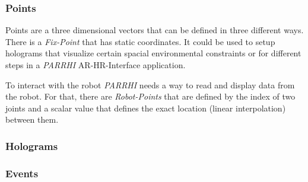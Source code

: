 \subsubsection{Points}\label{Section:Points}
Points are a three dimensional vectors that can be defined in three different ways. There is a \textit{Fix-Point} that has static coordinates. It could be used to setup holograms that visualize certain spacial environmental constraints or for different steps in a \textit{PARRHI} AR-HR-Interface application. 


To interact with the robot \textit{PARRHI} needs a way to read and display data from the robot. For that, there are \textit{Robot-Points} that are defined by the index of two joints and a scalar value that defines the exact location (linear interpolation) between them.


\subsubsection{Holograms}\label{Section:Holograms}
\subsubsection{Events}\label{Section:Events}














